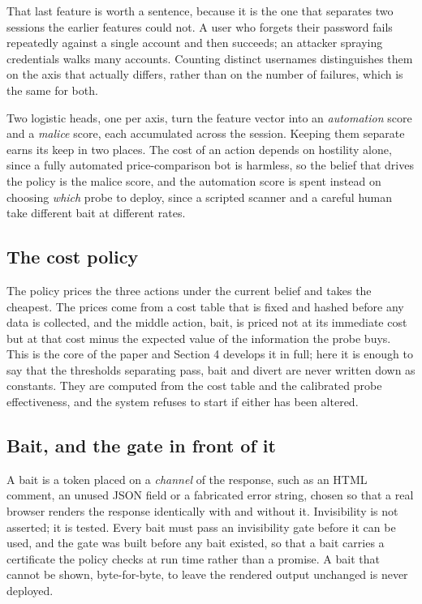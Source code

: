 That last feature is worth a sentence, because it is the one that separates two
sessions the earlier features could not. A user who forgets their password fails
repeatedly against a single account and then succeeds; an attacker spraying
credentials walks many accounts. Counting distinct usernames distinguishes them on
the axis that actually differs, rather than on the number of failures, which is the
same for both.

Two logistic heads, one per axis, turn the feature vector into an \emph{automation}
score and a \emph{malice} score, each accumulated across the session. Keeping them
separate earns its keep in two places. The cost of an action depends on hostility
alone, since a fully automated price-comparison bot is harmless, so the belief that
drives the policy is the malice score, and the automation score is spent instead
on choosing \emph{which} probe to deploy, since a scripted scanner and a careful human
take different bait at different rates.


\subsection{The cost policy}

The policy prices the three actions under the current belief and takes the
cheapest. The prices come from a cost table that is fixed and hashed before any
data is collected, and the middle action, bait, is priced not at its immediate
cost but at that cost minus the expected value of the information the probe buys.
This is the core of the paper and Section 4 develops it in full; here it is enough
to say that the thresholds separating pass, bait and divert are never written down
as constants. They are computed from the cost table and the calibrated probe
effectiveness, and the system refuses to start if either has been altered.


\subsection{Bait, and the gate in front of it}

A bait is a token placed on a \emph{channel} of the response, such as an HTML comment,
an unused JSON field or a fabricated error string, chosen so that a real browser
renders the response identically with and without it. Invisibility is not
asserted; it is tested. Every bait must pass an invisibility gate before it can be
used, and the gate was built before any bait existed, so that a bait carries a
certificate the policy checks at run time rather than a promise. A bait that
cannot be shown, byte-for-byte, to leave the rendered output unchanged is never
deployed.


